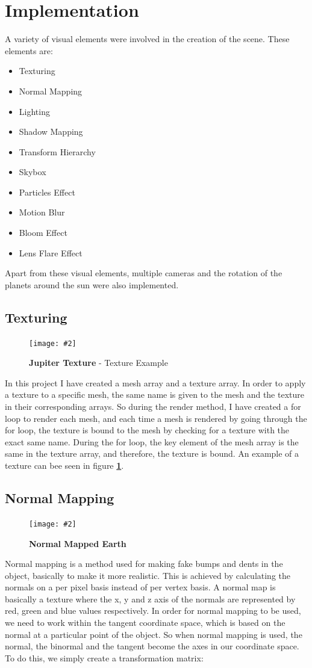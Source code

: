 \documentclass[10pt, a4paper]{article}
\newcommand{\figuremacro}[5]{
    \begin{figure}[#1]
        \centering
        \texttt{[image: \#2]}
        \caption[#3]{\textbf{#3}#4}
        \label{fig:#2}
    \end{figure}
}
\begin{document}
\section{Implementation}
	A variety of visual elements were involved in the creation of the scene. These elements are:
	\begin{itemize}
		\item Texturing
		\item Normal Mapping
		\item Lighting
		\item Shadow Mapping
		\item Transform Hierarchy
		\item Skybox
		\item Particles Effect
		\item Motion Blur
		\item Bloom Effect
		\item Lens Flare Effect
	\end{itemize}
	Apart from these visual elements, multiple cameras and the rotation of the planets around the sun were also implemented.
\subsection{Texturing}

	\figuremacro{H}{Jupiter}{Jupiter Texture}{ - Texture Example}{1.0}

	In this project I have created a mesh array and a texture array. In order to apply a texture to a specific mesh, the same name is given to the mesh and the texture in their corresponding arrays. So during the render method, I have created a for loop to render each mesh, and each time a mesh is rendered by going through the for loop, the texture is bound to the mesh by checking for a texture with the exact same name. During the for loop, the key element of the mesh array is the same in the texture array, and therefore, the texture is bound. An example of a texture can bee seen in figure \textbf{\ref{fig:Jupiter}}.


\subsection{Normal Mapping}
		
	\figuremacro{H}{Earth}{Normal Mapped Earth}{ }{1.0}
	
	Normal mapping is a method used for making fake bumps and dents in the object, basically to make it more realistic. This is achieved by calculating the normals on a per pixel basis instead of per vertex basis. A normal map is basically a texture  where the x, y and z axis of the normals are represented by red, green and blue values respectively. In order for normal mapping to be used, we need to work within the tangent coordinate space, which is based on the normal at a particular point of the object. So when normal mapping is used, the normal, the binormal and the tangent become the axes in our coordinate space. To do this, we simply create a transformation matrix:
	
\end{document}
